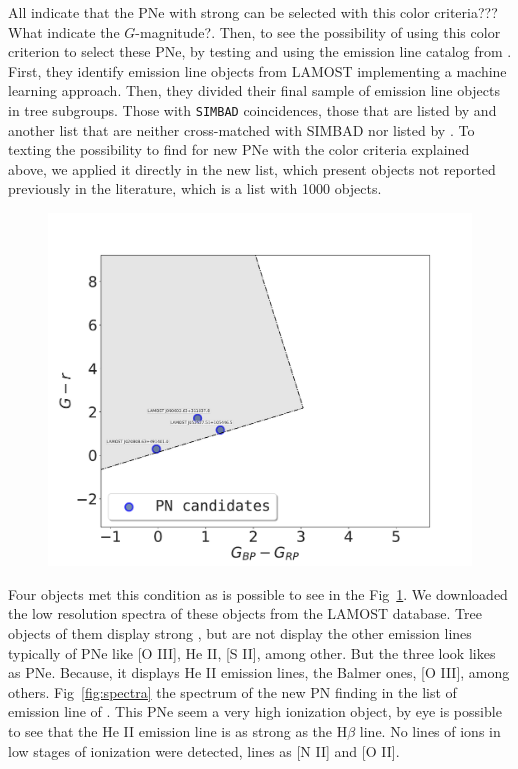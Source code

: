 \documentclass[fleqn,usenatbib]{mnras}
\begin{document}
All indicate that the PNe with strong \ha{} can be selected with this color criteria??? What indicate the $G$-magnitude?.
Then, to see the possibility of using this color criterion to select these PNe, by
testing and using the emission line catalog from  \citet{Skoda:2020}. First, they
identify emission line objects from LAMOST  implementing a machine learning approach.
Then, they divided their final sample of emission line objects in tree subgroups. Those with \texttt{SIMBAD}
coincidences, those that are listed by \citet{Hou:2016} and another list that are neither cross-matched with
SIMBAD nor listed by  \citet{Hou:2016}. To texting the possibility to find for new PNe with the color criteria
explained above, we applied it directly in the new list, which present objects not reported
previously in the literature, which is a list with 1000 objects.

\begin{figure}
\centering
  \includegraphics[width=0.9\linewidth]{Figs/pn-candidates-gaiaDR3.pdf}
  \caption{} 
  \label{fig:gaia-ps-apply}
\end{figure}

Four objects met this  condition as is possible to see in the Fig~\ref{fig:gaia-ps-apply}.
We downloaded the low resolution spectra of these objects from the LAMOST database. 
Tree objects of them display strong \ha{}, but are not display the other emission
lines typically of PNe like [O III], He II, [S II], among other. But the three look likes as PNe.
Because, it displays He II emission lines, the Balmer ones, [O III], among others.
Fig~\ref{fig:spectra} the spectrum of the new PN finding in the list of emission line of
\citet{Skoda:2020}. This PNe seem a very high ionization object, by eye is possible to see
that the He II emission line is as strong as the H$\beta$ line. No lines of ions in low stages
of ionization were detected, lines as [N II] and [O II].
\end{document}
